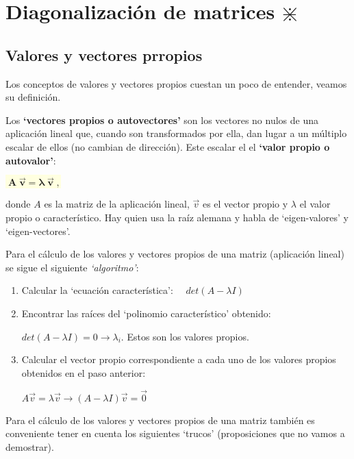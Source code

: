 
\chapter{Diagonalización de matrices  $\divideontimes$}	


	

\section{Valores y vectores prropios}

Los conceptos de valores y vectores propios cuestan un poco de entender, veamos su definición.

\begin{defi}
Los \textbf{`vectores propios o autovectores'} son los vectores no nulos de una aplicación lineal que, cuando son transformados por ella, dan lugar a un múltiplo escalar de ellos (no cambian de dirección). Este escalar el el \textbf{`valor propio o autovalor'}:

\vspace{4mm}\centerline{\colorbox{LightYellow}{$\boldsymbol{\; A\; \vec v = \lambda \; \vec v  \;,}$}}

\justify
donde $A$ es la matriz de la aplicación lineal, $\vec v$ es el vector propio y $\lambda$ el valor propio o característico. Hay quien usa la raíz alemana y habla de `eigen-valores' y `eigen-vectores'.

\end{defi}

Para el cálculo de los valores y vectores propios de una matriz (aplicación lineal) se sigue el siguiente \emph{`algoritmo'}:

\begin{enumerate}
\item Calcular la `ecuación característica': $\quad det(A-\lambda I)$
\item Encontrar las raíces del `polinomio característico' obtenido: 

$ det(A-\lambda I)=0 \longrightarrow \lambda_i$. Estos son los valores propios.

\item Calcular el vector propio correspondiente a cada uno de los valores propios obtenidos en el paso anterior:	

$A\vec v=\lambda \vec v \to (A-\lambda  I)\vec v=\vec 0$
\end{enumerate}

Para el cálculo de los valores y vectores propios de una matriz también es conveniente tener en cuenta los siguientes `trucos' \textcolor{gris}{(proposiciones que no vamos a demostrar)}.

